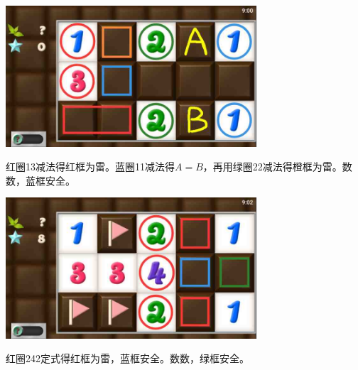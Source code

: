 \subsection{} %
\begin{center}
    \includegraphics[width=0.7\textwidth]{puzzlelow/115-1.jpg}
\end{center}
红圈13减法得红框为雷。蓝圈11减法得$A=B$，再用绿圈22减法得橙框为雷。数数，蓝框安全。
\begin{center}
    \includegraphics[width=0.7\textwidth]{puzzlelow/115-2.jpg}
\end{center}
红圈242定式得红框为雷，蓝框安全。数数，绿框安全。

